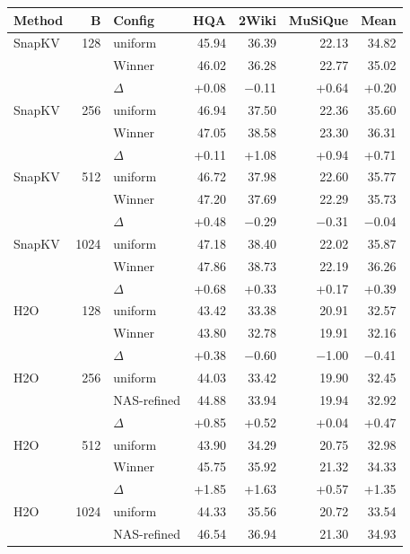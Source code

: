 \begin{table}[tp]
  \centering
  \scriptsize
  \setlength{\tabcolsep}{2.5pt}
  \begin{tabular}{@{}l r l r r r r @{}}
    \toprule
    Method & B & Config & HQA & 2Wiki & MuSiQue & Mean \\
    \midrule
    SnapKV & 128 & uniform & 45.94 & 36.39 & 22.13 & 34.82 \\
     &  & Winner & 46.02 & 36.28 & 22.77 & 35.02 \\
     &  & $\Delta$ & +0.08 & $-$0.11 & +0.64 & +0.20 \\
    \midrule
    SnapKV & 256 & uniform & 46.94 & 37.50 & 22.36 & 35.60 \\
     &  & Winner & 47.05 & 38.58 & 23.30 & 36.31 \\
     &  & $\Delta$ & +0.11 & +1.08 & +0.94 & +0.71 \\
    \midrule
    SnapKV & 512 & uniform & 46.72 & 37.98 & 22.60 & 35.77 \\
     &  & Winner & 47.20 & 37.69 & 22.29 & 35.73 \\
     &  & $\Delta$ & +0.48 & $-$0.29 & $-$0.31 & $-$0.04 \\
    \midrule
    SnapKV & 1024 & uniform & 47.18 & 38.40 & 22.02 & 35.87 \\
     &  & Winner & 47.86 & 38.73 & 22.19 & 36.26 \\
     &  & $\Delta$ & +0.68 & +0.33 & +0.17 & +0.39 \\
    \midrule
    H2O & 128 & uniform & 43.42 & 33.38 & 20.91 & 32.57 \\
     &  & Winner & 43.80 & 32.78 & 19.91 & 32.16 \\
     &  & $\Delta$ & +0.38 & $-$0.60 & $-$1.00 & $-$0.41 \\
    \midrule
    H2O & 256 & uniform & 44.03 & 33.42 & 19.90 & 32.45 \\
     &  & NAS-refined & 44.88 & 33.94 & 19.94 & 32.92 \\
     &  & $\Delta$ & +0.85 & +0.52 & +0.04 & +0.47 \\
    \midrule
    H2O & 512 & uniform & 43.90 & 34.29 & 20.75 & 32.98 \\
     &  & Winner & 45.75 & 35.92 & 21.32 & 34.33 \\
     &  & $\Delta$ & +1.85 & +1.63 & +0.57 & +1.35 \\
    \midrule
    H2O & 1024 & uniform & 44.33 & 35.56 & 20.72 & 33.54 \\
     &  & NAS-refined & 46.54 & 36.94 & 21.30 & 34.93 \\

\end{tabular}
\end{table}
